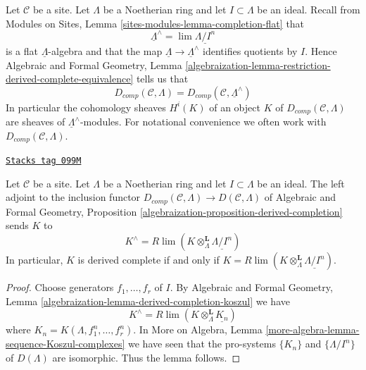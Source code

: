 \medskip\noindent
Let $\mathcal{C}$ be a site. Let $\Lambda$ be a Noetherian ring
and let $I \subset \Lambda$ be an ideal. Recall from
Modules on Sites, Lemma \ref{sites-modules-lemma-completion-flat}
that
$$
\underline{\Lambda}^\wedge = \lim \underline{\Lambda/I^n}
$$
is a flat $\underline{\Lambda}$-algebra and that the map
$\underline{\Lambda} \to \underline{\Lambda}^\wedge$ identifies
quotients by $I$. Hence
Algebraic and Formal Geometry, Lemma
\ref{algebraization-lemma-restriction-derived-complete-equivalence}
tells us that
$$
D_{comp}(\mathcal{C}, \Lambda) =
D_{comp}(\mathcal{C}, \underline{\Lambda}^\wedge)
$$
In particular the cohomology sheaves $H^i(K)$ of an object $K$ of
$D_{comp}(\mathcal{C}, \Lambda)$ are sheaves of
$\underline{\Lambda}^\wedge$-modules.
For notational convenience we often work with
$D_{comp}(\mathcal{C}, \Lambda)$.

\begin{lemma}
\label{proetale-lemma-naive-completion}
\href{https://stacks.math.columbia.edu/tag/099M}{\texttt{Stacks tag 099M}}

Let $\mathcal{C}$ be a site. Let $\Lambda$ be a Noetherian ring
and let $I \subset \Lambda$ be an ideal. The left adjoint
to the inclusion functor
$D_{comp}(\mathcal{C}, \Lambda) \to D(\mathcal{C}, \Lambda)$
of Algebraic and Formal Geometry, Proposition
\ref{algebraization-proposition-derived-completion} sends $K$ to
$$
K^\wedge = R\lim(K \otimes_\Lambda^\mathbf{L} \underline{\Lambda/I^n})
$$
In particular, $K$ is derived complete if and only if
$K = R\lim(K \otimes_\Lambda^\mathbf{L} \underline{\Lambda/I^n})$.
\end{lemma}

\begin{proof}
Choose generators $f_1, \ldots, f_r$ of $I$. By
Algebraic and Formal Geometry, Lemma
\ref{algebraization-lemma-derived-completion-koszul}
we have
$$
K^\wedge =
R\lim (K \otimes_\Lambda^\mathbf{L} \underline{K_n})
$$
where $K_n = K(\Lambda, f_1^n, \ldots, f_r^n)$.
In More on Algebra, Lemma \ref{more-algebra-lemma-sequence-Koszul-complexes}
we have seen that the pro-systems $\{K_n\}$ and
$\{\Lambda/I^n\}$ of $D(\Lambda)$
are isomorphic. Thus the lemma follows.
\end{proof}

